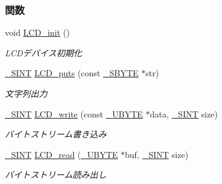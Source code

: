 \subsubsection*{関数}
\begin{DoxyCompactItemize}
\item 
void \hyperlink{lcd_8h_a0742e25c23ca1096ceba081b98fd58ba_a0742e25c23ca1096ceba081b98fd58ba}{L\+C\+D\+\_\+init} ()
\begin{DoxyCompactList}\small\item\em L\+C\+Dデバイス初期化 \end{DoxyCompactList}\item 
\hyperlink{stddef_8h_aefd1068e35d26c0e7d7079ddf2579174_aefd1068e35d26c0e7d7079ddf2579174}{\+\_\+\+S\+I\+N\+T} \hyperlink{lcd_8h_a3d46ceb22c2384020a98e15f10282b53_a3d46ceb22c2384020a98e15f10282b53}{L\+C\+D\+\_\+puts} (const \hyperlink{stddef_8h_aab65237ca9fbf4192a39cf12dd165942_aab65237ca9fbf4192a39cf12dd165942}{\+\_\+\+S\+B\+Y\+T\+E} $\ast$str)
\begin{DoxyCompactList}\small\item\em 文字列出力 \end{DoxyCompactList}\item 
\hyperlink{stddef_8h_aefd1068e35d26c0e7d7079ddf2579174_aefd1068e35d26c0e7d7079ddf2579174}{\+\_\+\+S\+I\+N\+T} \hyperlink{lcd_8h_aa7a8edd7456c3094ba77da7c3314541b_aa7a8edd7456c3094ba77da7c3314541b}{L\+C\+D\+\_\+write} (const \hyperlink{stddef_8h_aac464b47452ce9406f88ef194e2becc1_aac464b47452ce9406f88ef194e2becc1}{\+\_\+\+U\+B\+Y\+T\+E} $\ast$data, \hyperlink{stddef_8h_aefd1068e35d26c0e7d7079ddf2579174_aefd1068e35d26c0e7d7079ddf2579174}{\+\_\+\+S\+I\+N\+T} size)
\begin{DoxyCompactList}\small\item\em バイトストリーム書き込み \end{DoxyCompactList}\item 
\hyperlink{stddef_8h_aefd1068e35d26c0e7d7079ddf2579174_aefd1068e35d26c0e7d7079ddf2579174}{\+\_\+\+S\+I\+N\+T} \hyperlink{lcd_8h_a9c4a1acb160debcf4337e1dc195c40dc_a9c4a1acb160debcf4337e1dc195c40dc}{L\+C\+D\+\_\+read} (\hyperlink{stddef_8h_aac464b47452ce9406f88ef194e2becc1_aac464b47452ce9406f88ef194e2becc1}{\+\_\+\+U\+B\+Y\+T\+E} $\ast$buf, \hyperlink{stddef_8h_aefd1068e35d26c0e7d7079ddf2579174_aefd1068e35d26c0e7d7079ddf2579174}{\+\_\+\+S\+I\+N\+T} size)
\begin{DoxyCompactList}\small\item\em バイトストリーム読み出し \end{DoxyCompactList}\item 

\end{DoxyCompactItemize}

